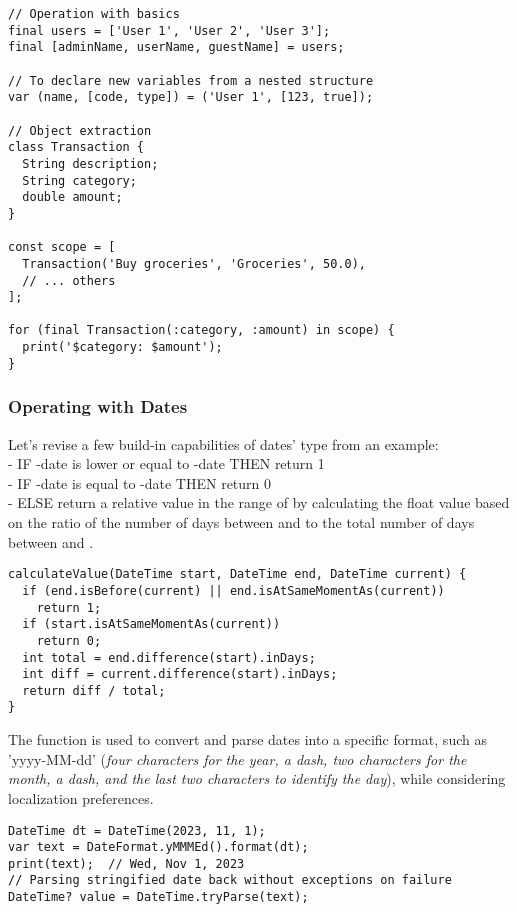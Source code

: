\begin{lstlisting}
// Operation with basics
final users = ['User 1', 'User 2', 'User 3'];
final [adminName, userName, guestName] = users;

// To declare new variables from a nested structure
var (name, [code, type]) = ('User 1', [123, true]);

// Object extraction
class Transaction {
  String description;
  String category;
  double amount;
}

const scope = [
  Transaction('Buy groceries', 'Groceries', 50.0),
  // ... others
];

for (final Transaction(:category, :amount) in scope) {
  print('$category: $amount');
}
\end{lstlisting}


\subsubsection{Operating with Dates}

Let's revise a few build-in capabilities of dates' type from an example:\\
- IF -date is lower or equal to -date THEN return 1\\
- IF -date is equal to -date THEN return 0\\
- ELSE return a relative value in the range of  by calculating the float value based on the ratio of the number
of days between  and  to the total number of days between  and .

\begin{lstlisting}
calculateValue(DateTime start, DateTime end, DateTime current) {
  if (end.isBefore(current) || end.isAtSameMomentAs(current))
    return 1;
  if (start.isAtSameMomentAs(current))
    return 0;
  int total = end.difference(start).inDays;
  int diff = current.difference(start).inDays;
  return diff / total;
}
\end{lstlisting}

\noindent The  function is used to convert and parse dates into a specific format, such as 'yyyy-MM-dd'
(\emph{four characters for the year, a dash, two characters for the month, a dash, and the last two characters
to identify the day}), while considering localization preferences.

\begin{lstlisting}
DateTime dt = DateTime(2023, 11, 1);
var text = DateFormat.yMMMEd().format(dt);
print(text);  // Wed, Nov 1, 2023
// Parsing stringified date back without exceptions on failure
DateTime? value = DateTime.tryParse(text);
\end{lstlisting}

